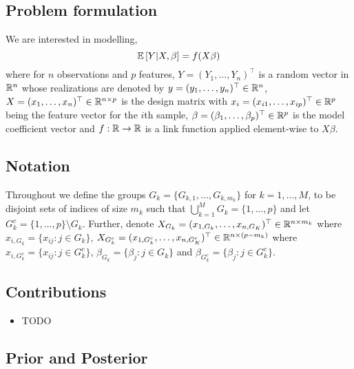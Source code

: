 \documentclass[12pt]{article}
\begin{document}

\subsection*{Problem formulation}

We are interested in modelling,
\begin{equation} \label{eq:prob_formulation} 
    \mathbb{E} \left[ Y | X, \beta \right] = f(X \beta)
\end{equation}
where for $n$ observations and $p$ features, $Y = (Y_1, \dots, Y_n)^\top$ is a random vector in $\mathbb{R}^n$ whose realizations are denoted by $y = (y_1, \dots, y_n)^\top \in \mathbb{R}^n$, $X = (x_1, \dots, x_n)^\top \in \mathbb{R}^{n \times p}$ is the design matrix with $x_i = (x_{i1}, \dots, x_{ip})^\top \in \mathbb{R}^p$ being the feature vector for the $i$th sample, $\beta = (\beta_1, \dots, \beta_p)^\top \in \mathbb{R}^p$ is the model coefficient vector and $f: \mathbb{R} \rightarrow \mathbb{R}$ is a link function applied element-wise to $X \beta$.

\subsection*{Notation}

Throughout we define the groups $G_k = \{ G_{k,1}, \dots, G_{k, m_k} \}$ for $k=1,\dots,M$, to be disjoint sets of indices of size $m_k$ such that $ \bigcup_{k=1}^M G_k = \{1, \dots, p \}$ and let $G_k^c = \{1,\dots, p \} \setminus G_k$. Further, denote $X_{G_k} = (x_{1, G_k}, \dots, x_{n, G_K})^\top \in \mathbb{R}^{n \times m_k}$ where $x_{i, G_k} = \{x_{ij} : j \in G_k \}$,
$X_{G_k^c} = (x_{1, G_k^c}, \dots, x_{n, G_K^c})^\top \in \mathbb{R}^{n \times (p - m_k)}$ where $x_{i, G_k^c} = \{x_{ij} : j \in G_k^c \}$, $\beta_{G_k} = \{\beta_j : j \in G_k \}$ and $\beta_{G_k^c} = \{ \beta_j : j \in G_k^c \}$.


\subsection*{Contributions}

\begin{itemize}
    \item TODO
\end{itemize}


\newpage
\subsection*{Prior and Posterior}
\end{document}
